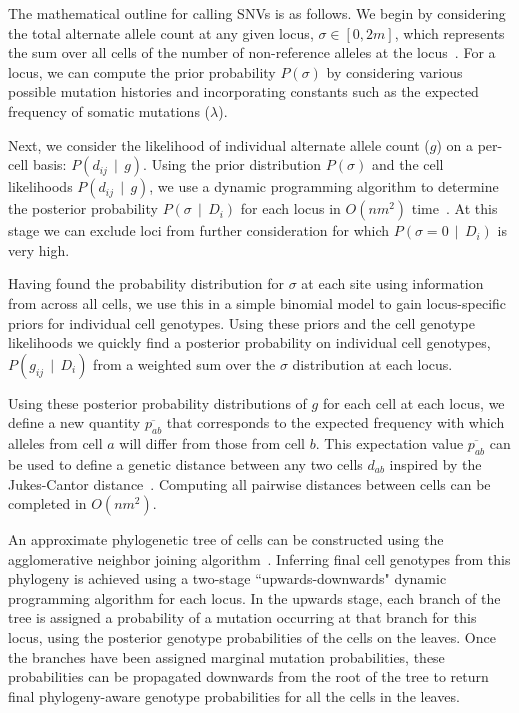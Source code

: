 \documentclass[../../main.tex]{subfiles}
\begin{document}
The mathematical outline for calling SNVs is as follows.
We begin by considering the total alternate allele count at any given locus, $\sigma\in [0,2m]$, which represents the sum over all cells of the number of non-reference alleles at the locus~\cite{monovar, listatistical}.
For a locus, we can compute the prior probability $P(\sigma)$ by considering various possible mutation histories and incorporating constants such as the expected frequency of somatic mutations ($\lambda$).

Next, we consider the likelihood of individual alternate allele count ($g$) on a per-cell basis: $P(d_{ij}\,\mid\,g)$.
Using the prior distribution $P(\sigma)$ and the cell likelihoods $P(d_{ij}\,\mid\,g)$, we use a dynamic programming algorithm to determine the posterior probability $P(\sigma\,\mid\,D_i)$ for each locus in $O(nm^2)$ time~\cite{monovar, ledurbin, listatistical}.
At this stage we can exclude loci from further consideration for which $P(\sigma = 0\,\mid\, D_i)$ is very high.

Having found the probability distribution for $\sigma$ at each site using information from across all cells, we use this in a simple binomial model to gain locus-specific priors for individual cell genotypes.
Using these priors and the cell genotype likelihoods we quickly find a posterior probability on individual cell genotypes, $P(g_{ij}\,\mid\, D_i)$ from a weighted sum over the $\sigma$ distribution at each locus.

Using these posterior probability distributions of $g$ for each cell at each locus, we define a new quantity $\overline{p_{ab}}$ that corresponds to the expected frequency with which alleles from cell $a$ will differ from those from cell $b$.
This expectation value $\overline{p_{ab}}$ can be used to define a genetic distance between any two cells $d_{ab}$ inspired by the Jukes-Cantor distance~\cite{BSA, JC}.
Computing all pairwise distances between cells can be completed in $O(nm^2)$.

An approximate phylogenetic tree of cells can be constructed using the agglomerative neighbor joining algorithm~\cite{BSA, NJ}.
Inferring final cell genotypes from this phylogeny is achieved using a two-stage ``upwards-downwards" dynamic programming algorithm for each locus.
In the upwards stage, each branch of the tree is assigned a probability of a mutation occurring at that branch for this locus, using the posterior genotype probabilities of the cells on the leaves.
Once the branches have been assigned marginal mutation probabilities, these probabilities can be propagated downwards from the root of the tree to return final phylogeny-aware genotype probabilities for all the cells in the leaves.
\end{document}
